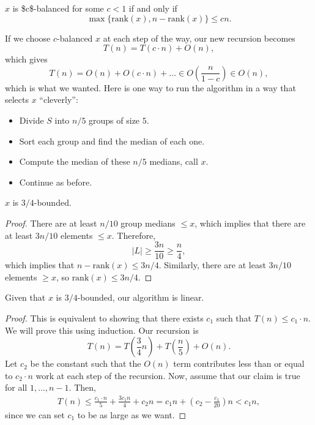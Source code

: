 \begin{definition}

$x$ is \ac{$c$-balanced} for some $c < 1$ if and only if \vspace{-0.3cm}
\[\max\{\text{rank}(x), n-\text{rank}(x)\}\leq cn .\]
\end{definition}

If we choose $c$-balanced $x$ at each step of the way, our new recursion becomes 
\[T(n) = T(c\cdot n) + O(n),\]
which gives 
\[T(n) = O(n) + O(c\cdot n) + \hdots \in O\left(\frac{n}{1-c}\right)\in O(n),\]
which is what we wanted. Here is one way to run the algorithm in a way that selects $x$ ``cleverly'':
\begin{itemize}
    \item Divide $S$ into $n/5$ groups of size $5$.
    \item Sort each group and find the median of each one.
    \item Compute the median of these $n/5$ medians, call $x$.
    \item Continue as before. 
\end{itemize}

\begin{theorem}
\lemlabel

$x$ is $3/4$-bounded. 
\end{theorem}

\begin{proof}
There are at least $n/10$ group medians $\leq x$, which implies that there are at least $3n/10$ elements $\leq x$. Therefore, 
\[\vert L\vert \geq \frac{3n}{10}\geq \frac{n}{4},\]
which implies that $n-\text{rank}(x)\leq 3n/4$. Similarly, there are at least $3n/10$ elements $\geq x$, so $\text{rank}(x)\leq 3n/4$.
\end{proof}

\begin{theorem}
\lemlabel

Given that $x$ is $3/4$-bounded, our algorithm is linear. 
\end{theorem}

\begin{proof}
This is equivalent to showing that there exists $c_1$ such that $T(n)\leq c_1\cdot n$. We will prove this using induction. Our recursion is
\[T(n) = T\left(\frac{3}{4}n\right) + T\left(\frac{n}{5}\right) + O(n).\]
Let $c_2$ be the constant such that the $O(n)$ term contributes less than or equal to $c_2\cdot n$ work at each step of the recursion. Now, assume that our claim is true for all $1, \hdots, n-1$. Then, 
\begin{align*}
    T(n) \leq \frac{c_1\cdot n}{5} + \frac{3c_1n}{4} + c_2n = c_1n + \left(c_2 - \frac{c_1}{20}\right)n < c_1n,
\end{align*}
since we can set $c_1$ to be as large as we want. 
\end{proof}

